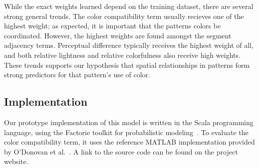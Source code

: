 While the exact weights learned depend on the training dataset, there are several strong general trends. The color compatibility term usually recieves one of the highest weight; as expected, it is important that the patterns colors be coordinated. However, the highest weights are found amongst the segment adjacency terms. Perceptual difference typically receives the highest weight of all, and both relative lightness and relative colorfulness also receive high weights. These trends supports our hypothesis that spatial relationships in patterns form strong predictors for that pattern's use of color.

\subsection{Implementation}
\label{sec:implementation}

Our prototype implementation of this model is written in the Scala programming language, using the Factorie toolkit for probabilistic modeling~\cite{Factorie}. To evaluate the color compatibility term, it uses the reference MATLAB implementation provided by O'Donovan et al.~. A link to the source code can be found on the project website.